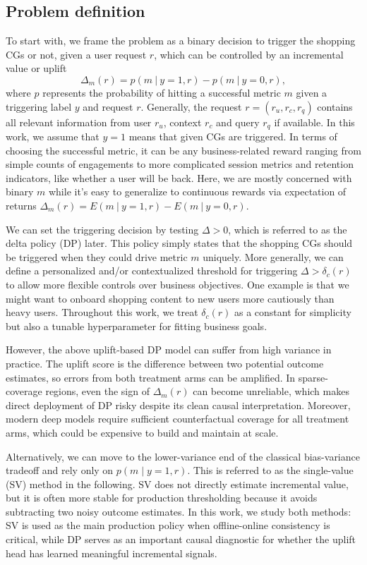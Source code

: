 \documentclass[sigconf, authorversion]{acmart}
\begin{document}
\subsection{Problem definition} \label{sec:problem_def}
To start with, we frame the problem as a binary decision to trigger the shopping CGs or not, given a user request $r$, which can be controlled by an incremental value or uplift
\begin{equation}
    \Delta_m(r) = p(m~|~y=1,r) - p(m~|~y=0,r),
\end{equation}
where $p$ represents the probability of hitting a successful metric $m$ given a triggering label $y$ and request $r$. Generally, the request $r = (r_u, r_c, r_q)$ contains all relevant information from user $r_u$, context $r_c$ and query $r_q$ if available. In this work, we assume that $y=1$ means that given CGs are triggered. In terms of choosing the successful metric, it can be any business-related reward ranging from simple counts of engagements to more complicated session metrics and retention indicators, like whether a user will be back. Here, we are mostly concerned with binary $m$ while it's easy to generalize to continuous rewards via expectation of returns $\Delta_m(r) = E(m~|~y=1,r) - E(m~|~y=0,r)$.

We can set the triggering decision by testing $\Delta>0$, which is referred to as the delta policy (DP) later. This policy simply states that the shopping CGs should be triggered when they could drive metric $m$ uniquely. More generally, we can define a personalized and/or contextualized threshold for triggering $\Delta>\delta_c(r)$ to allow more flexible controls over business objectives. One example is that we might want to onboard shopping content to new users more cautiously than heavy users. Throughout this work, we treat $\delta_c(r)$ as a constant for simplicity but also a tunable hyperparameter for fitting business goals.

However, the above uplift-based DP model can suffer from high variance in practice. The uplift score is the difference between two potential outcome estimates, so errors from both treatment arms can be amplified. In sparse-coverage regions, even the sign of $\Delta_m(r)$ can become unreliable, which makes direct deployment of DP risky despite its clean causal interpretation. Moreover, modern deep models require sufficient counterfactual coverage for all treatment arms, which could be expensive to build and maintain at scale.

Alternatively, we can move to the lower-variance end of the classical bias-variance tradeoff and rely only on $p(m\mid y=1,r)$. This is referred to as the single-value (SV) method in the following. SV does not directly estimate incremental value, but it is often more stable for production thresholding because it avoids subtracting two noisy outcome estimates. In this work, we study both methods: SV is used as the main production policy when offline-online consistency is critical, while DP serves as an important causal diagnostic for whether the uplift head has learned meaningful incremental signals.
\end{document}
